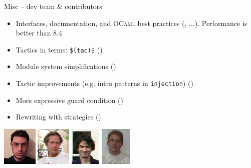 \begin{subsecframefragile}{Misc -- \Coq dev team \& contributors}
  \begin{itemize}
  \item Interfaces, documentation, and \textsc{OCaml} best practices
    (, $\ldots$). \alert{Performance is better than 8.4}
  \item Tactics in terms: \verb|$(tac)$| ()
  \item Module system simplifications ()
  \item Tactic improvements (e.g. intro patterns in \texttt{injection})
    ()
  \item More expressive guard condition ()
  \item Rewriting with strategies ()
  \end{itemize}
  
  \begin{center}
    \includegraphics[height=5em]{pedrot}
    \hspace{2em}\includegraphics[height=5em]{letouzey}
    \hspace{2em}\includegraphics[height=5em]{herbelin-ias}
    \hspace{2em}\includegraphics[height=5em]{boutillier.png}
  \end{center}
\end{subsecframefragile}


